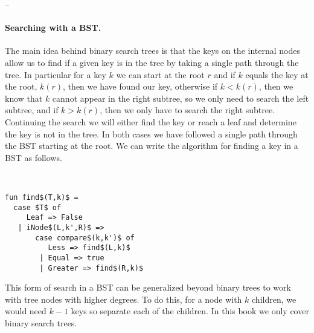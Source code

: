 --


\paragraph{Searching with a BST.}
The main idea behind binary search trees is that the keys on the
internal nodes allow us to find if a given key is in the tree  by
taking a single path through the tree.  In particular for a key $k$ we
can start at the root $r$ and if $k$ equals the key at the root,
$k(r)$, then we have found our key, otherwise if $k < k(r)$, then we
know that $k$ cannot appear in the right subtree, so we only need to
search the left subtree, and if $k > k(r)$, then we only have to
search the right subtree.  Continuing the search we will either find
the key or reach a leaf and determine the key is not in the tree.  In
both cases we have followed a single path through the BST starting at
the root.   We can write the algorithm for finding a key in 
a BST as follows.

\begin{algorithm}~
\begin{lstlisting}[numbers=none]
fun find$(T,k)$ =
  case $T$ of 
     Leaf => False
   | iNode$(L,k',R)$ => 
       case compare$(k,k')$ of
          Less => find$(L,k)$
        | Equal => true
        | Greater => find$(R,k)$
\end{lstlisting}
\end{algorithm}

This form of search in a BST can be generalized beyond binary trees to
work with tree nodes with higher degrees.  To do this, for a node with
$k$ children, we would need $k-1$ keys so separate each of the
children.  In this book we only cover binary search trees.

